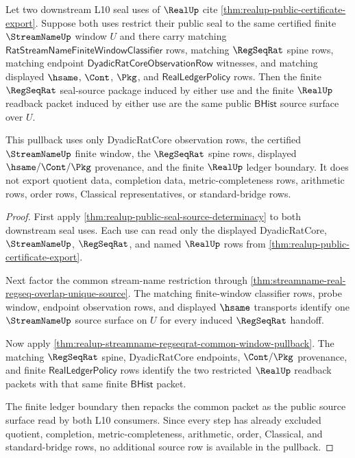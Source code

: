 \begin{theorem}
\label{thm:regseqrat-finite-window-seal-source-pullback}
Let two downstream L10 seal uses of $\RealUp$ cite
\autoref{thm:realup-public-certificate-export}. Suppose both uses restrict
their public seal to the same certified finite $\StreamNameUp$ window $U$ and
there carry matching $\mathsf{RatStreamNameFiniteWindowClassifier}$ rows,
matching $\RegSeqRat$ spine rows, matching endpoint
$\mathsf{DyadicRatCoreObservationRow}$ witnesses, and matching displayed
$\hsame$, $\Cont$, $\Pkg$, and $\mathsf{RealLedgerPolicy}$ rows. Then the
finite $\RegSeqRat$ seal-source package induced by either use and the finite
$\RealUp$ readback packet induced by either use are the same public
$\mathsf{BHist}$
source surface over $U$.

This pullback uses only DyadicRatCore observation rows, the certified
$\StreamNameUp$ finite window, the $\RegSeqRat$ spine rows, displayed
$\hsame/\Cont/\Pkg$ provenance, and the finite $\RealUp$ ledger boundary. It
does not export quotient data, completion data, metric-completeness rows,
arithmetic rows, order rows, Classical representatives, or standard-bridge
rows.
\end{theorem}
\begin{proof}
First apply \autoref{thm:realup-public-seal-source-determinacy} to both
downstream seal uses. Each use can read only the displayed DyadicRatCore,
$\StreamNameUp$, $\RegSeqRat$, and named $\RealUp$ rows from
\autoref{thm:realup-public-certificate-export}.

Next factor the common stream-name restriction through
\autoref{thm:streamname-real-regseq-overlap-unique-source}. The matching
finite-window classifier rows, probe window, endpoint observation rows, and
displayed $\hsame$ transports identify one $\StreamNameUp$ source surface on
$U$ for every induced $\RegSeqRat$ handoff.

Now apply \autoref{thm:realup-streamname-regseqrat-common-window-pullback}.
The matching $\RegSeqRat$ spine, DyadicRatCore endpoints, $\Cont/\Pkg$
provenance, and finite $\mathsf{RealLedgerPolicy}$ rows identify the two
restricted $\RealUp$ readback packets with that same finite $\mathsf{BHist}$
packet.

The finite ledger boundary then repacks the common packet as the public source
surface read by both L10 consumers. Since every step has already excluded
quotient, completion, metric-completeness, arithmetic, order, Classical, and
standard-bridge rows, no additional source row is available in the pullback.
\end{proof}

